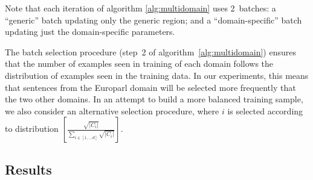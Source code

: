 \documentclass[11pt,a4paper]{article}
\DeclareMathOperator*{\argmin}{argmin}
\newcommand{\fyTodo}[1]{\Todo[FY:]{\textcolor{orange}{#1}}}
\begin{document}
Note that each iteration of algorithm \ref{alg:multidomain} uses 2~batches: a ``generic'' batch updating only the generic region; and a ``domain-specific'' batch updating just the domain-specific parameters. 

The batch selection procedure (step~2 of algorithm~\ref{alg:multidomain}) ensures that the number of examples seen in training of each domain follows the distribution of examples seen in the training data.
In our experiments, this means that sentences from the Europarl domain will be selected more frequently that the two other domains. In an attempt to build a more balanced training sample, we also consider an alternative selection procedure, where $i$ is selected according to  distribution $[\frac{\sqrt{|C_i|}}{\sum_{i\in [1,..,d]}\sqrt{|C_i|}}]$.

\subsection{Results \label{ssec:results}}
\end{document}
